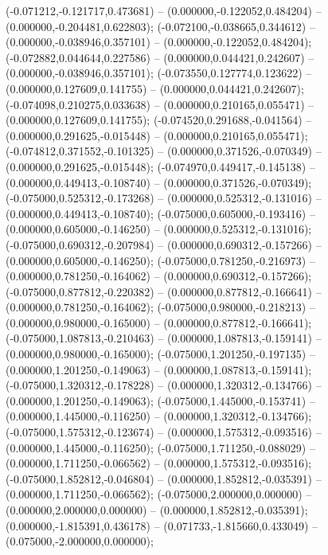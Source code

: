  (-0.071212,-0.121717,0.473681) -- (0.000000,-0.122052,0.484204) -- (0.000000,-0.204481,0.622803);
 (-0.072100,-0.038665,0.344612) -- (0.000000,-0.038946,0.357101) -- (0.000000,-0.122052,0.484204);
 (-0.072882,0.044644,0.227586) -- (0.000000,0.044421,0.242607) -- (0.000000,-0.038946,0.357101);
 (-0.073550,0.127774,0.123622) -- (0.000000,0.127609,0.141755) -- (0.000000,0.044421,0.242607);
 (-0.074098,0.210275,0.033638) -- (0.000000,0.210165,0.055471) -- (0.000000,0.127609,0.141755);
 (-0.074520,0.291688,-0.041564) -- (0.000000,0.291625,-0.015448) -- (0.000000,0.210165,0.055471);
 (-0.074812,0.371552,-0.101325) -- (0.000000,0.371526,-0.070349) -- (0.000000,0.291625,-0.015448);
 (-0.074970,0.449417,-0.145138) -- (0.000000,0.449413,-0.108740) -- (0.000000,0.371526,-0.070349);
 (-0.075000,0.525312,-0.173268) -- (0.000000,0.525312,-0.131016) -- (0.000000,0.449413,-0.108740);
 (-0.075000,0.605000,-0.193416) -- (0.000000,0.605000,-0.146250) -- (0.000000,0.525312,-0.131016);
 (-0.075000,0.690312,-0.207984) -- (0.000000,0.690312,-0.157266) -- (0.000000,0.605000,-0.146250);
 (-0.075000,0.781250,-0.216973) -- (0.000000,0.781250,-0.164062) -- (0.000000,0.690312,-0.157266);
 (-0.075000,0.877812,-0.220382) -- (0.000000,0.877812,-0.166641) -- (0.000000,0.781250,-0.164062);
 (-0.075000,0.980000,-0.218213) -- (0.000000,0.980000,-0.165000) -- (0.000000,0.877812,-0.166641);
 (-0.075000,1.087813,-0.210463) -- (0.000000,1.087813,-0.159141) -- (0.000000,0.980000,-0.165000);
 (-0.075000,1.201250,-0.197135) -- (0.000000,1.201250,-0.149063) -- (0.000000,1.087813,-0.159141);
 (-0.075000,1.320312,-0.178228) -- (0.000000,1.320312,-0.134766) -- (0.000000,1.201250,-0.149063);
 (-0.075000,1.445000,-0.153741) -- (0.000000,1.445000,-0.116250) -- (0.000000,1.320312,-0.134766);
 (-0.075000,1.575312,-0.123674) -- (0.000000,1.575312,-0.093516) -- (0.000000,1.445000,-0.116250);
 (-0.075000,1.711250,-0.088029) -- (0.000000,1.711250,-0.066562) -- (0.000000,1.575312,-0.093516);
 (-0.075000,1.852812,-0.046804) -- (0.000000,1.852812,-0.035391) -- (0.000000,1.711250,-0.066562);
 (-0.075000,2.000000,0.000000) -- (0.000000,2.000000,0.000000) -- (0.000000,1.852812,-0.035391);
 (0.000000,-1.815391,0.436178) -- (0.071733,-1.815660,0.433049) -- (0.075000,-2.000000,0.000000);

